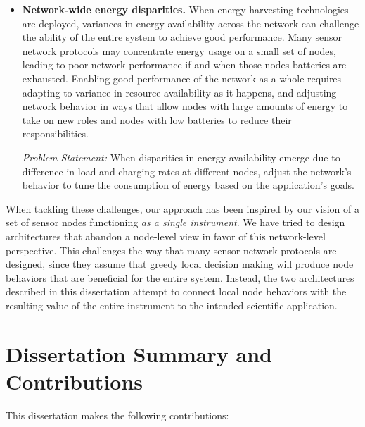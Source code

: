 \begin{itemize}
\item \textbf{Network-wide energy disparities.} When energy-harvesting
technologies are deployed, variances in energy availability across the
network can challenge the ability of the entire system to achieve good
performance. Many sensor network protocols may concentrate energy usage on a
small set of nodes, leading to poor network performance if and when those
nodes batteries are exhausted. Enabling good performance of the network as a
whole requires adapting to variance in resource availability as it happens,
and adjusting network behavior in ways that allow nodes with large amounts of
energy to take on new roles and nodes with low batteries to reduce their
responsibilities.

\textit{Problem Statement:} When disparities in energy availability emerge
due to difference in load and charging rates at different nodes, adjust the
network's behavior to tune the consumption of energy based on the
application's goals.

\end{itemize}

When tackling these challenges, our approach has been inspired by our vision
of a set of sensor nodes functioning \textit{as a single instrument}. We have
tried to design architectures that abandon a node-level view in favor of this
network-level perspective. This challenges the way that many sensor network
protocols are designed, since they assume that greedy local decision making
will produce node behaviors that are beneficial for the entire system.
Instead, the two architectures described in this dissertation attempt to
connect local node behaviors with the resulting value of the entire
instrument to the intended scientific application.

\section{Dissertation Summary and Contributions}

This dissertation makes the following contributions:

